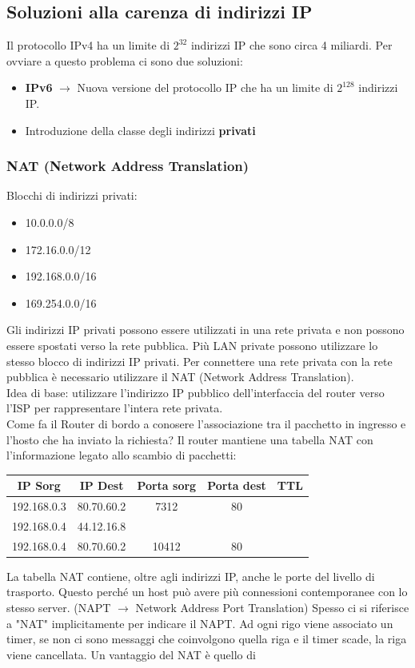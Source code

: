 \documentclass[a4paper]{article}
\begin{document}
\subsection{Soluzioni alla carenza di indirizzi IP}

Il protocollo IPv4 ha un limite di $2^{32}$ indirizzi IP che sono circa 4 miliardi. Per ovviare a questo problema ci sono due soluzioni:
\begin{itemize}
  \item \textbf{IPv6} $\rightarrow$ Nuova versione del protocollo IP che ha un limite di $2^{128}$ indirizzi IP.
  \item Introduzione della classe degli indirizzi \textbf{privati}
\end{itemize}

\subsubsection{NAT (Network Address Translation)}
Blocchi di indirizzi privati:
\begin{itemize}
  \item 10.0.0.0/8
  \item 172.16.0.0/12
  \item 192.168.0.0/16
  \item 169.254.0.0/16 
\end{itemize}
Gli indirizzi IP privati possono essere utilizzati in una rete privata e non possono essere spostati verso la rete pubblica.
Più LAN private possono utilizzare lo stesso blocco di indirizzi IP privati. Per connettere una rete privata con la rete pubblica è necessario utilizzare il NAT (Network Address Translation).
\\
Idea di base: utilizzare l'indirizzo IP pubblico dell'interfaccia del router verso l'ISP per rappresentare l'intera rete privata.
\\
Come fa il Router di bordo a conosere l'associazione tra il pacchetto in ingresso e l'hosto che ha inviato la richiesta?
Il router mantiene una tabella NAT con l'informazione legato allo scambio di pacchetti:
\begin{table}[H]
  \centering
  \begin{tabular}{|c|c|c|c|c|}
    \hline
    IP Sorg & IP Dest & Porta sorg & Porta dest & TTL\\
    \hline
    192.168.0.3 & 80.70.60.2 & 7312 & 80 & \\
    192.168.0.4 & 44.12.16.8 & & & \\
    192.168.0.4 & 80.70.60.2 & 10412 & 80 & \\
    \hline
  \end{tabular}
\end{table}
\noindent
La tabella NAT contiene, oltre agli indirizzi IP, anche le porte del livello di trasporto. Questo perché un host può avere più connessioni contemporanee con lo stesso server. (NAPT $\rightarrow$ Network Address Port Translation)
Spesso ci si riferisce a "NAT" implicitamente per indicare il NAPT.
Ad ogni rigo viene associato un timer, se non ci sono messaggi che coinvolgono quella riga e il timer scade, la riga viene cancellata.
Un vantaggio del NAT è quello di 
\end{document}
